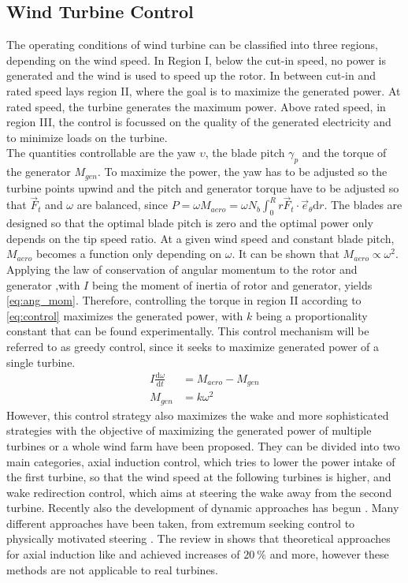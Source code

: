 \subsection{Wind Turbine Control}
The operating conditions of wind turbine can be classified into three regions, depending on the wind speed. In Region I, below the cut-in speed, no power is generated and the wind is used to speed up the rotor. In between cut-in and rated speed lays region II, where the goal is to maximize the generated power. At rated speed, the turbine generates the maximum power. Above rated speed, in region III, the control is focussed$  $ on the quality of the generated electricity and to minimize loads on the turbine. \cite{boersma_tutorial_2017} \\
 The quantities controllable are the yaw $\upsilon$, the blade pitch $\gamma_p$ and the torque of the generator $M_{gen}$. To maximize the power, the yaw has to be adjusted so the turbine points upwind and the pitch and generator torque have to be adjusted so that $\vec{F}_t$ and $\omega$ are balanced, since $P = \omega M_{aero} = \omega N_b \int_0^Rr\vec{F}_t \cdot \vec{e}_\theta \mathrm{d}r$. The blades are designed so that the optimal blade pitch is zero and the optimal power only depends on the tip speed ratio. At a given wind speed and constant blade pitch, $M_{aero}$ becomes a function only depending on $\omega$. It can be shown that $M_{aero} \propto \omega^2$. Applying the law of conservation of angular momentum to the rotor and generator ,with $I$ being the moment of inertia of rotor and generator, yields \eqref{eq:ang_mom}. Therefore, controlling the torque in region II according to \eqref{eq:control} maximizes the generated power, with $k$ being a proportionality constant that can be found experimentally. This control mechanism will be referred to as greedy control, since it seeks to maximize generated power of a single turbine. \cite[p.63 - 77]{hansen_aerodynamics_2008}
\begin{align}
	I\frac{\mathrm{d}\omega}{\mathrm{d}t} &= M_{aero} - M_{gen} \label{eq:ang_mom} \\
	M_{gen} &= k \omega^2 \label{eq:control} 
\end{align}
However, this control strategy also maximizes the wake and more sophisticated strategies with the objective of maximizing the generated power of multiple turbines or a whole wind farm have been proposed. They can be divided into two main categories, axial induction control, which tries to lower the power intake of the first turbine, so that the wind speed at the following turbines is higher, and wake redirection control, which aims at steering the wake away from the second turbine. \cite{boersma_tutorial_2017} Recently also the development of dynamic approaches has begun \cite{frederik_helix_2020}. Many different approaches have been taken, from extremum seeking control \cite{ciri_large-eddy_2017} to physically motivated steering \cite{frederik_helix_2020}. The review in \cite{kheirabadi_quantitative_2019} shows that theoretical approaches for axial induction like \cite{vali_adjoint-based_2017} and \cite{munters_towards_2018} achieved increases of $\SI{20}{\percent}$ and more, however these methods are not applicable to real turbines.